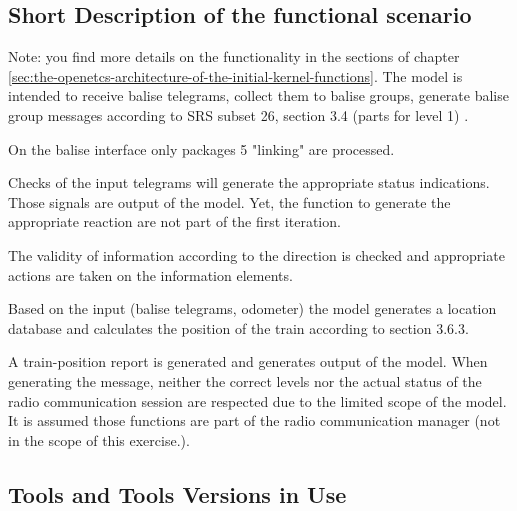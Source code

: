 \documentclass{template/openetcs_report}
\begin{document}
\subsection{Short Description of the functional scenario}
Note: you find more details on the functionality in the sections of chapter \ref*{sec:the-openetcs-architecture-of-the-initial-kernel-functions}.
The model is intended to receive balise telegrams, collect them to balise groups, generate balise group messages according to SRS subset 26, section 3.4 (parts for level 1) .

On the balise interface only packages 5 "linking" are processed.

Checks of the input telegrams will generate the appropriate status indications. Those signals are output of the model. Yet, the function to generate the appropriate reaction are not part of the first iteration.

The validity of information according to the direction is checked and appropriate actions are taken on the information elements.

Based on the input (balise telegrams, odometer) the model generates a location database and calculates the position of the train according to section 3.6.3.

A train-position report is generated and generates output of the model. When generating the message, neither the correct levels nor the actual status of the radio communication session are respected due to the limited scope of the model. It is assumed those functions are part of the radio communication manager (not in the scope of this exercise.).

\subsection{Tools and Tools Versions in Use}
\end{document}

